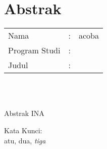 %
%
%

\chapter*{Abstrak}

\vspace*{0.2cm}

\noindent \begin{tabular}{l l p{10cm}}
	Nama&: & acoba \\
	Program Studi&: & \program \\
	Judul&: & \judul \\
\end{tabular} \\ 

\vspace*{0.5cm}

\noindent 
\\ Abstrak INA

\vspace*{0.2cm}

\noindent Kata Kunci: \\ 
\noindent atu, dua, \textit{tiga}\\ 

\newpage